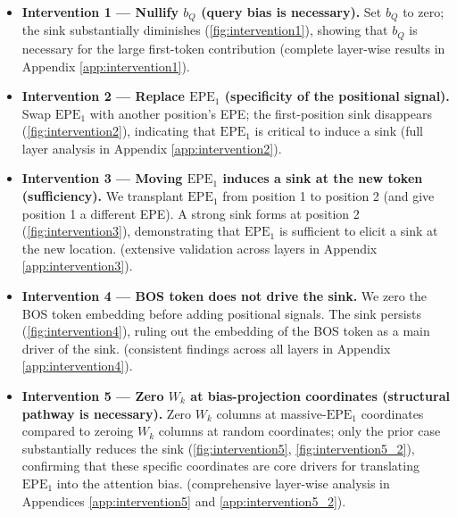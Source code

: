 \documentclass[11pt]{article}
\begin{document}
\begin{itemize}[leftmargin=*]
  \item \textbf{Intervention 1 — Nullify $b_Q$ (query bias is necessary).} Set $b_Q$ to zero; the sink substantially diminishes (\cref{fig:intervention1}), showing that $b_Q$ is necessary for the large first-token contribution (complete layer-wise results in Appendix \ref{app:intervention1}).
  \item \textbf{Intervention 2 — Replace $\mathrm{EPE}_1$ (specificity of the positional signal).} Swap $\mathrm{EPE}_1$ with another position’s EPE; the first-position sink disappears (\cref{fig:intervention2}), indicating that $\mathrm{EPE}_1$ is critical to induce a sink (full layer analysis in Appendix \ref{app:intervention2}).
  \item \textbf{Intervention 3 — Moving $\mathrm{EPE}_1$ induces a sink at the new token (sufficiency).} We transplant $\mathrm{EPE}_1$ from position 1 to position 2 (and give position 1 a different EPE). A strong sink forms at position 2 (\cref{fig:intervention3}), demonstrating that $\mathrm{EPE}_1$ is sufficient to elicit a sink at the new location. (extensive validation across layers in Appendix \ref{app:intervention3}).
  \item \textbf{Intervention 4 — BOS token does not drive the sink.} We zero the BOS token embedding before adding positional signals. The sink persists (\cref{fig:intervention4}), ruling out the embedding of the BOS token as a main driver of the sink. (consistent findings across all layers in Appendix \ref{app:intervention4}).
  \item \textbf{Intervention 5 — Zero $W_k$ at bias-projection coordinates (structural pathway is necessary).} Zero $W_k$ columns at massive-$\mathrm{EPE}_1$ coordinates compared to zeroing $W_k$ columns at random coordinates; only the prior case substantially reduces the sink (\cref{fig:intervention5}, \cref{fig:intervention5_2}), confirming that these specific coordinates are core drivers for translating $\mathrm{EPE}_1$ into the attention bias. (comprehensive layer-wise analysis in Appendices \ref{app:intervention5} and \ref{app:intervention5_2}).
\end{itemize}
\end{document}

